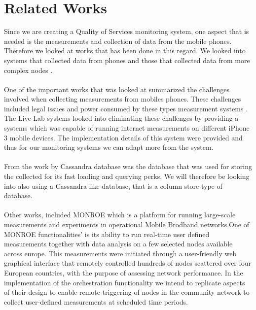 \section{Related Works}
Since we are creating a Quality of Services monitoring system, one aspect that is needed is the measurements and collection of data from the mobile phones. Therefore we looked at works that has been done in this regard. We looked into systems that collected data from phones and those that collected data from more complex nodes \cite{7523537, Shepard:2011:LMW:1925019.1925023}. 
\paragraph{}
One of the important works that was looked at summarized the challenges involved when collecting measurements from mobiles phones. These challenges included legal issues and power consumed by these types measurement systems \cite{Shepard:2011:LMW:1925019.1925023}. The Live-Lab systems \cite{Shepard:2011:LMW:1925019.1925023} looked into eliminating these challenges by providing a systems which was capable of running internet measurements on different iPhone 3 mobile devices. The implementation details of this system were provided and thus for our monitoring systems we can adapt more from the system.
\paragraph{}
From the work by \cite{7523537,8255998} Cassandra database was the database that was used for storing the collected for its fast loading and querying perks. We will therefore be looking into also using a Cassandra like database, that is a column store type of database.

\paragraph{}
Other works, included MONROE which is a platform for running large-scale measurements and experiments in operational Mobile Brodband networks\cite{7523537}.One of MONROE functionalities' is its ability to run real-time user defined measurements together with data analysis on a few selected nodes available across europe\cite{7523537}. This measurements were initiated through a user-friendly web graphical interface that remotely controlled hundreds of nodes scattered over four European countries, with the purpose of assessing network performance\cite{7523537}. In the implementation of the orchestration functionality we intend to replicate aspects of their design to enable remote triggering of nodes in the community network to collect user-defined measurements at scheduled time periods. 

